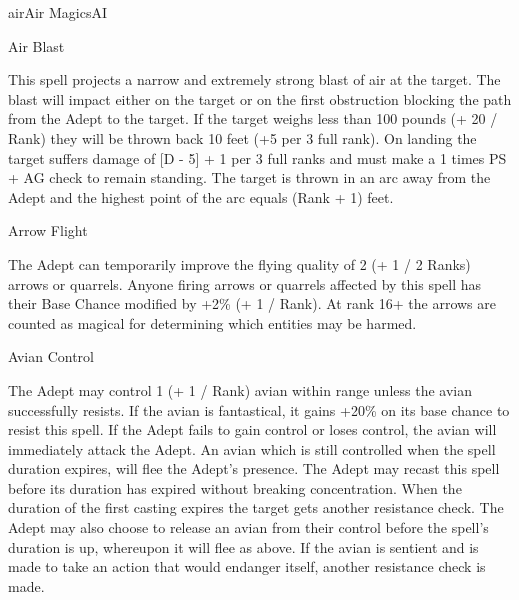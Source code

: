 \begin{College}[2.1]{air}{Air Magics}{AI}
\begin{spell}[S-1]{Air Blast}
\begin{effects}
This spell projects a narrow and extremely strong blast of air at the
target.  The blast will impact either on the target or on the first
obstruction blocking the path from the Adept to the target.  If the
target weighs less than 100 pounds (+ 20 / Rank) they will be thrown
back 10 feet (+5 per 3 full rank). On landing the target suffers
damage of [D - 5] + 1 per 3 full ranks and must make a 1 times PS + AG
check to remain standing.  The target is thrown in an arc away from
the Adept and the highest point of the arc equals (Rank + 1) feet.
\end{effects}
\end{spell}

\begin{spell}[S-2]{Arrow Flight}

\begin{effects}
The Adept can temporarily improve the flying quality of 2 (+ 1 / 2
Ranks) arrows or quarrels.  Anyone firing arrows or quarrels affected
by this spell has their Base Chance modified by +2\% (+ 1 / Rank). At
rank 16+ the arrows are counted as magical for determining which
entities may be harmed.
\end{effects}
\end{spell}

\begin{spell}[S-3]{Avian Control}

\begin{effects}
The Adept may control 1 (+ 1 / Rank) avian within range unless the
avian successfully resists. If the avian is fantastical, it gains
+20\% on its base chance to resist this spell. If the Adept fails to
gain control or loses control, the avian will immediately attack the
Adept.  An avian which is still controlled when the spell duration
expires, will flee the Adept’s presence.  The Adept may recast this
spell before its duration has expired without breaking concentration.
When the duration of the first casting expires the target gets another
resistance check.  The Adept may also choose to release an avian from
their control before the spell’s duration is up, whereupon it will
flee as above.  If the avian is sentient and is made to take an action
that would endanger itself, another resistance check is made.
\end{effects}
\end{spell}


\end{College}
